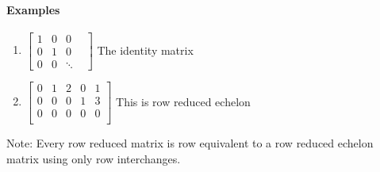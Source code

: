 \documentclass[10pt,letter]{article}
\begin{document}
\paragraph*{Examples}
\begin{enumerate}
    \item $\begin{bmatrix}
    1 & 0 & 0 &  \\
    0 & 1 & 0 &  \\
    0 & 0 & \ddots &   
\end{bmatrix}$ The identity matrix  
\item $\begin{bmatrix}
    0 & 1 & 2 & 0 & 1 \\
    0 & 0 & 0 & 1 & 3 \\
    0 & 0 & 0 & 0 & 0 \\  
\end{bmatrix}$ This is row reduced echelon
\end{enumerate}
Note: Every row reduced matrix is row equivalent to a row reduced echelon matrix using only row interchanges. 
\end{document}
